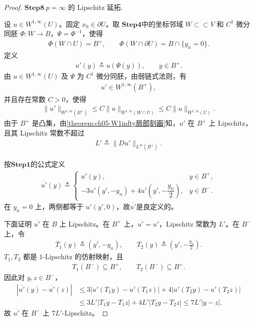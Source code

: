 \documentclass[../../main.tex]{subfiles}%
\begin{document}
\begin{proof}
\noindent$\mathbf{Step}\bm{8}$.{\heiti \(p=\infty\) 的 Lipschitz 延拓.}

设 \(u\in W^{1,\infty}(U)\)。固定 \(x_0\in\partial U\)。取 $\mathbf{Step 4}$中的坐标邻域 \(W\subset\subset V\) 和 \(C^1\) 微分同胚 \(\Phi:W\to B\)，\(\Psi=\Phi^{-1}\)，使得
\begin{align*}
\Phi(W\cap U)=B^+,\qquad
\Phi(W\cap\partial U)=B\cap\{y_n=0\}.
\end{align*}
定义
\begin{align*}
u'(y)\triangleq u(\Psi(y)),\qquad y\in B^+.
\end{align*}
由 \(u\in W^{1,\infty}(U)\) 及 \(\Psi\) 为 \(C^1\) 微分同胚，由弱链式法则，有
\begin{align*}
u'\in W^{1,\infty}(B^+),
\end{align*}
并且存在常数 \(C>0\)，使得
\begin{align}
\|u'\|_{W^{1,\infty}(B^+)}
\leqslant C\|u\|_{W^{1,\infty}(W\cap U)}
\leqslant C\|u\|_{W^{1,\infty}(U)}.
\label{eq:u'-W1infty估计}
\end{align}
由于 \(B^+\) 是凸集，由\cref{theorem:ch05-W1infty局部刻画}知，\(u'\) 在 \(B^+\) 上 Lipschitz，且其 Lipschitz 常数不超过
\begin{align*}
L'\triangleq\|Du'\|_{L^\infty(B^+)}.
\end{align*}

按$\mathbf{Step 1}$的公式定义
\begin{align*}
\overline{u'}(y)\triangleq
\begin{cases}
u'(y), & y\in B^+,\\[4pt]
-3u'(y',-y_n)+4u'\left(y',-\dfrac{y_n}{2}\right), & y\in B^-.
\end{cases}
\end{align*}
在 \(y_n=0\) 上，两侧都等于 \(u'(y',0)\)，故$\overline{u'}$是良定义的。

下面证明 \(\overline{u'}\) 在 \(B\) 上 Lipschitz。在 \(B^+\) 上，\(\overline{u'}=u'\)，Lipschitz 常数为 \(L'\)。在 \(B^-\) 上，令
\begin{align*}
T_1(y)\triangleq(y',-y_n),\qquad
T_2(y)\triangleq\left(y',-\frac{y_n}{2}\right).
\end{align*}
\(T_1,T_2\) 都是 \(1\)-Lipschitz 的仿射映射，且
\begin{align*}
T_1(B^-)\subseteq B^+,\qquad
T_2(B^-)\subseteq B^+.
\end{align*}
因此对 \(y,z\in B^-\)，
\begin{align*}
|\overline{u'}(y)-\overline{u'}(z)|
&\leqslant3|u'(T_1y)-u'(T_1z)|
+4|u'(T_2y)-u'(T_2z)|\\
&\leqslant3L'|T_1y-T_1z|+4L'|T_2y-T_2z|
\leqslant7L'|y-z|.
\end{align*}
故 \(\overline{u'}\) 在 \(B^-\) 上 \(7L'\)-Lipschitz。


\end{proof}
\end{document}
